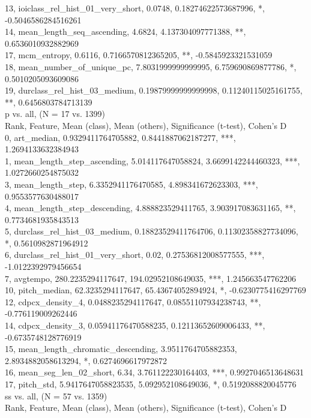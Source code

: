 13, ioiclass_rel_hist_01_very_short, 0.0748, 0.18274622573687996, *, -0.5046586284516261\\
14, mean_length_seq_ascending, 4.6824, 4.137304097771388, **, 0.6536010932882969\\
17, mcm_entropy, 0.6116, 0.7166570812365205, **, -0.5845923321531059\\
18, mean_number_of_unique_pc, 7.8031999999999995, 6.759690869877786, *, 0.5010205093609086\\
19, durclass_rel_hist_03_medium, 0.19879999999999998, 0.11240115025161755, **, 0.6456803784713139\\
p vs. all, (N = 17 vs. 1399)\\
Rank, Feature, Mean (class), Mean (others), Significance (t-test), Cohen's D\\
0, art_median, 0.9329411764705882, 0.8441887062187277, ***, 1.2694133632384943\\
1, mean_length_step_ascending, 5.014117647058824, 3.6699142244460323, ***, 1.0272660254875032\\
3, mean_length_step, 6.3352941176470585, 4.898341672623303, ***, 0.9553577630488017\\
4, mean_length_step_descending, 4.888823529411765, 3.903917083631165, **, 0.7734681935843513\\
5, durclass_rel_hist_03_medium, 0.18823529411764706, 0.11302358827734096, *, 0.5610982871964912\\
6, durclass_rel_hist_01_very_short, 0.02, 0.27536812008577555, ***, -1.0122392979456654\\
7, avgtempo, 280.2235294117647, 194.02952108649035, ***, 1.245663547762206\\
10, pitch_median, 62.3235294117647, 65.43674052894924, *, -0.6230775416297769\\
12, cdpcx_density_4, 0.0488235294117647, 0.08551107934238743, **, -0.776119009262446\\
14, cdpcx_density_3, 0.05941176470588235, 0.12113652609006433, **, -0.6735748128776919\\
15, mean_length_chromatic_descending, 3.9511764705882353, 2.8934882058613294, *, 0.6274696617972872\\
16, mean_seg_len_02_short, 6.34, 3.761122230164403, ***, 0.9927046513648631\\
17, pitch_std, 5.9417647058823535, 5.092952108649036, *, 0.5192088820045776\\
ss vs. all, (N = 57 vs. 1359)\\
Rank, Feature, Mean (class), Mean (others), Significance (t-test), Cohen's D\\
